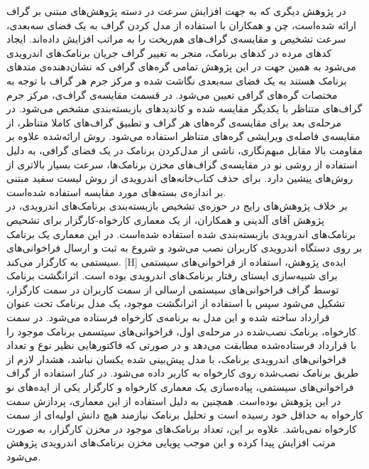 در پژوهش دیگری که به جهت افزایش سرعت در دسته‌ پژوهش‌های مبتنی بر گراف ارائه شده‌است، چن و همکاران با استفاده از مدل کردن گراف به یک فضای سه‌بعدی، سرعت تشخیص و مقایسه‌ی گراف‌های هم‌ریخت را به مراتب افزایش داده‌اند. ایجاد کد‌های مرده‌ در کد‌های برنامک، منجر به تغییر گراف‌ جریان برنامک‌های اندرویدی می‌شود به همین جهت در این پژوهش تمامی گره‌های گرافی که نشان‌دهنده‌ی متد‌های برنامک هستند به یک فضای سه‌بعدی نگاشت شده و مرکز جرم هر گراف با توجه به مختصات گره‌های گرافی تعیین می‌شود. در قسمت مقایسه‌ی گراف‌ی، مرکز جرم گراف‌‌های متناظر با یکدیگر مقایسه شده و کاندید‌های بازبسته‌بندی مشخص می‌شود. در مرحله‌ی بعد برای مقایسه‌ی گره‌های هر گراف و تطبیق گراف‌های کاملا متناظر، از مقایسه‌ی فاصله‌ی ویرایشی گره‌های متناظر استفاده می‌شود. روش ارائه‌شده علاوه بر مقاومت بالا مقابل مبهم‌نگاری، ناشی از مدل‌کردن برنامک در یک فضای گرافی، به دلیل استفاده از روشی نو در مقایسه‌ی گراف‌های مخزن برنامک‌ها، سرعت بسیار بالاتری از روش‌های پیشین دارد. برای حذف کتاب‌خانه‌های اندرویدی از روش لیست سفید مبتنی بر اندازه‌ی بسته‌های مورد مقایسه استفاده شده‌است.
\\
بر خلاف پژوهش‌های رایج در حوزه‌ی تشخیص بازبسته‌بندی برنامک‌های اندرویدی، در پژوهش آقای آلدینی و همکاران، از یک معماری کارخواه-کارگزار‌ برای تشحیص برنامک‌های اندرویدی بازبسته‌بندی شده استفاده شده‌است. در این معماری یک برنامک بر روی دستگاه اندرویدی کاربران نصب می‌شود و شروع به ثبت و ارسال فراخوانی‌های سیستمی به کارگزار می‌کند.
[H]
\vspace{1em}
ایده‌ی پژوهش، استفاده از فراخوانی‌های سیستمی برای شبیه‌سازی ایستا‌ی رفتار برنامک‌های اندرویدی بوده است. اثرانگشت برنامک توسط گراف فراخوانی‌های سیستمی ارسالی از سمت کاربران در سمت کارگزار، تشکیل می‌شود سپس با استفاده از اثرانگشت موجود، یک مدل برنامک تحت عنوان قرارداد ساخته شده و این مدل به برنامه‌ی کارخواه فرستاده می‌شود. در سمت کارخواه، برنامک نصب‌شده در مرحله‌ی اول، فراخوانی‌های سیتسمی برنامک موجود را با قرارداد فرستاده‌شده مطابقت می‌دهد و در صورتی که فاکتور‌هایی نظیر نوع و تعداد فراخوانی‌های اندرویدی برنامک، با مدل پیش‌بینی شده یکسان نباشد، هشدار لازم از طریق برنامک نصب‌شده روی کارخواه به کاربر داده می‌شود. در کنار استفاده از گراف فراخوانی‌‌های سیستمی، پیاده‌سازی یک معماری کارخواه و کارگزار یکی از ایده‌های نو در این پژوهش بوده‌است. همچنین به دلیل استفاده از این معماری، پردازش سمت کارخواه به حداقل خود رسیده است و تحلیل برنامک نیازمند هیچ دانش اولیه‌ای از سمت کارخواه نمی‌باشد. علاوه بر این، تعداد برنامک‌های موجود در مخزن کارگزار، به صورت مرتب افزایش پیدا کرده و این موجب پویایی مخزن برنامک‌های اندرویدی پژوهش می‌شود. \\

